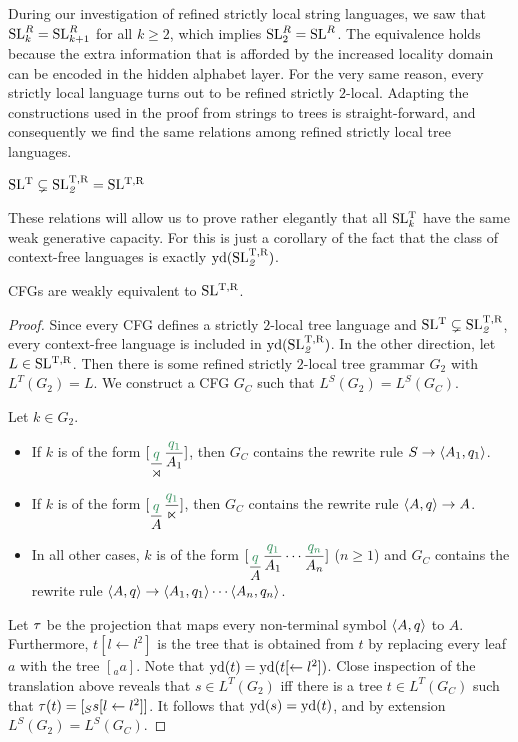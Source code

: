 During our investigation of refined strictly local string languages, we saw that $\SL^R_k = \SL^R_{k+1}$ for all $k \geq 2$, which implies $\SL^R_2 = \SL^R$.
The equivalence holds because the extra information that is afforded by the increased locality domain can be encoded in the hidden alphabet layer.
For the very same reason, every strictly local language turns out to be refined strictly $2$-local.
Adapting the constructions used in the proof from strings to trees is straight-forward, and consequently we find the same relations among refined strictly local tree languages.
%
\begin{theorem}
    $\SLT \subsetneq \SLTR[2] = \SLTR$
\end{theorem}
%
These relations will allow us to prove rather elegantly that all $\SLT[k]$ have the same weak generative capacity.
For this is just a corollary of the fact that the class of context-free languages is exactly $\Yield(\SLTR[2])$.
%
\begin{theorem}
    CFGs are weakly equivalent to $\SLTR$.
\end{theorem}
%
\begin{proof}
    Since every CFG defines a strictly $2$-local tree language and $\SLT \subsetneq \SLTR[2]$, every context-free language is included in $\Yield(\SLTR[2])$.
    In the other direction, let $L \in \SLTR$.
    Then there is some refined strictly $2$-local tree grammar $G_2$ with $L^T(G_2) = L$.
    We construct a CFG $G_C$ such that $L^S(G_2) = L^S(G_C)$.

    Let $k \in G_2$.
    \begin{itemize}
        \item If $k$ is of the form $[_{\kState{q}{\LeftEdge}} \kState{q_1}{A_1}]$, then $G_C$ contains the rewrite rule $S \rewrite \tuple{A_1,q_1}$.
        \item If $k$ is of the form $[_{\kState{q}{A}} \kState{q_1}{\RightEdge}]$, then $G_C$ contains the rewrite rule $\tuple{A,q} \rewrite A$.
        \item In all other cases, $k$ is of the form $[_{\kState{q}{A}} \kState{q_1}{A_1} \cdots \kState{q_n}{A_n}]$ ($n \geq 1$) and $G_C$ contains the rewrite rule $\tuple{A,q} \rewrite \tuple{A_1,q_1} \cdots \tuple{A_n,q_n}$.
    \end{itemize}

    Let $\transduction$ be the projection that maps every non-terminal symbol $\tuple{A,q}$ to $A$.
    Furthermore, $t[l \leftarrow l^2]$ is the tree that is obtained from $t$ by replacing every leaf $a$ with the tree $[_a a]$.
    Note that $\Yield(t) = \Yield(t[ \leftarrow l^2])$.
    Close inspection of the translation above reveals that $s \in L^T(G_2)$ iff there is a tree $t \in L^T(G_C)$ such that $\transduction(t) = [_S s[l \leftarrow l^2]]$.
    It follows that $\Yield(s) = \Yield(t)$, and by extension $L^S(G_2) = L^S(G_C)$. 
\end{proof}


